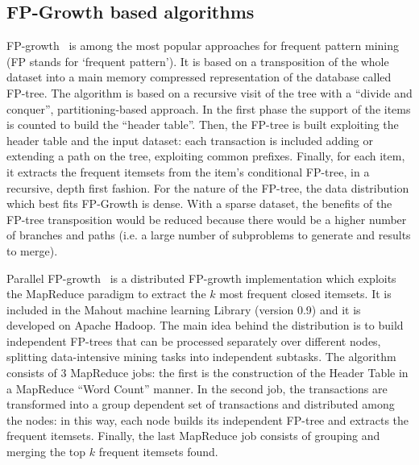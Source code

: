 \subsection{FP-Growth based algorithms}
\label{FP-Growth}
FP-growth~\cite{Han00} is among the most popular approaches for frequent pattern
mining (FP stands for ‘frequent pattern’). It is based on a transposition of the
whole dataset into a main memory compressed representation of the database
called FP-tree. The algorithm is based on a recursive visit of the tree with a
“divide and conquer”, partitioning-based approach. In the first phase the support of the items is
counted to build the ``header table''. Then, the FP-tree is built exploiting the
header table and the input dataset: each transaction is included adding or
extending a path on the tree, exploiting common prefixes. Finally, for each
item, it extracts the frequent itemsets from the item’s conditional FP-tree, in
a recursive, depth first fashion. For the nature of the FP-tree, the data
distribution which best fits FP-Growth is dense. With a sparse dataset, the
benefits of the FP-tree transposition would be reduced because there would be a
higher number of branches and paths \cite{KumarBook} (i.e. a large number of
subproblems to generate and results to merge).

Parallel FP-growth~\cite{pfpgrowth} is a distributed FP-growth implementation
which exploits the MapReduce paradigm to extract the $k$ most frequent closed
itemsets. It is included in the Mahout machine learning Library (version 0.9)
and it is developed on Apache Hadoop. The main idea behind the distribution is
to build independent FP-trees that can be processed separately
over different nodes, splitting data-intensive mining tasks
into independent subtasks.
The algorithm consists of 3 MapReduce jobs: the first is the construction of
the Header Table in a MapReduce ``Word Count'' manner. In the second job, the
transactions are transformed into a group dependent set of transactions and
distributed among the nodes: in this way, each node builds its independent
FP-tree and extracts the frequent itemsets. Finally, the last MapReduce job
consists of grouping and merging the top $k$ frequent itemsets found.


